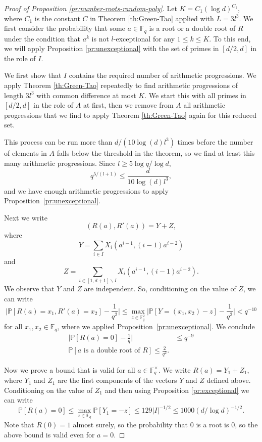 \documentclass[12pt, notitlepage]{amsart}
\numberwithin{equation}{section}
\def\P{\mathbb P}
\def\F{\mathbb F}
\theoremstyle{remark}
\theoremstyle{definition}
\theoremstyle{remark}
\numberwithin{equation}{section}
\begin{document}
\begin{proof}[Proof of Proposition \ref{pr:number-roots-random-poly}]
Let $K=C_1(\log d)^{C_1}$,
where $C_1$ is the constant $C$
in Theorem \ref{th:Green-Tao}
applied with $L=3l^3$.
We first consider the probability that some $a\in\F_q$
is a root or a double root of $R$
under the condition that $a^k$ is not $l$-exceptional for any $1\le k\le K$.
To this end, we will apply Proposition \ref{pr:unexceptional} with the set of
primes in $[d/2,d]$ in the role of $I$.


We first show that $I$ contains the required number of arithmetic progressions.
We apply Theorem \ref{th:Green-Tao} repeatedly to find arithmetic progressions
of length $3l^3$ with common difference at most $K$.
We start this with all primes in $[d/2,d]$ in the role of $A$ at first, then
we remove from $A$ all arithmetic progressions that we find to apply
Theorem \ref{th:Green-Tao} again for this reduced set.

This process can be run more than $d/(10\log(d) l^3)$ times before the number
of elements in $A$ falls below the threshold in the theorem, so
we find at least this many arithmetic progressions.
Since $l\ge 5\log q/\log d$,
\[
q^{5/(l+1)}\le \frac{d}{10\log(d) l^3}, 
\]
and we have enough arithmetic progressions to apply Proposition~\ref{pr:unexceptional}.

Next we write
\[
(R(a),R'(a))= Y+Z,
\]
where
\[
Y=\sum_{i\in I}X_{i}(a^{i-1},(i-1)a^{i-2})
\]
and
\[
Z=\sum_{i\in [1,d+1]\backslash I}X_{i}(a^{i-1},(i-1)a^{i-2}).
\]
We observe that $Y$ and $Z$ are independent. So, conditioning on the value of $Z$, we can write
\[
\Big|\P[R(a)=x_1,R'(a)=x_2]-\frac{1}{q^2}\Big|
\le \max_{z\in\F_q^2}\Big|\P[Y=(x_1,x_2)-z]-\frac{1}{q^2}\Big|
< q^{-10}
\]
for all $x_1,x_2\in\F_q$, where we applied Proposition~\ref{pr:unexceptional}.
We conclude
\begin{align}
\Big|\P[R(a)=0]-\frac{1}{q}\Big|&\le q^{-9}\label{eq:unexceptional1}\\
\P[\text{$a$ is a double root of $R$}]\le \frac{2}{q^2}.\label{eq:unexceptional2}
\end{align}

Now we prove a bound that is valid for all $a\in\F_q^{\times}$.
We write $R(a)=Y_1+Z_1$, where $Y_1$ and $Z_1$ are the first components
of the vectors $Y$ and $Z$ defined above.
Conditioning on the value of $Z_1$ and then using
Proposition \ref{pr:exceptional} we can write
\[
\P[R(a)=0]\le \max_{z\in\F_q}\P[Y_1=-z]\le 129 |I|^{-1/2}\le 1000 (d/\log d) ^{-1/2}.
\]
Note that $R(0)=1$ almost surely, so the probability that $0$ is a root is $0$, so
the above bound is valid even for $a=0$.


\end{proof}
\end{document}
